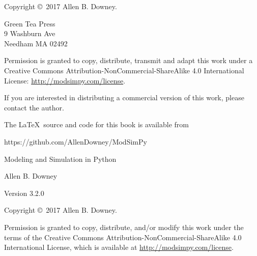 \documentclass[12pt]{book}
\newcommand{\thetitle}{Modeling and Simulation in Python}
\newcommand{\theauthors}{Allen B. Downey}
\newcommand{\theversion}{3.2.0}
\theoremstyle{exercise}
\begin{document}
\begin{latexonly}
\pagebreak
\thispagestyle{empty}

Copyright \copyright ~2017 \theauthors.



\vspace{0.2in}

\begin{flushleft}
Green Tea Press       \\
9 Washburn Ave \\
Needham MA 02492
\end{flushleft}

Permission is granted to copy, distribute, transmit and adapt this work under a Creative Commons Attribution-NonCommercial-ShareAlike 4.0 International License: \url{http://modsimpy.com/license}.


If you are interested in distributing a commercial version of this
work, please contact the author.

The \LaTeX\ source and code for this book is available from

\begin{code}
https://github.com/AllenDowney/ModSimPy
\end{code}


\cleardoublepage
\setcounter{tocdepth}{1}
\tableofcontents

\end{latexonly}



\begin{htmlonly}

\vspace{1em}

{\Large \thetitle}

{\large \theauthors}

Version \theversion

\vspace{1em}

Copyright \copyright ~2017 \theauthors.

Permission is granted to copy, distribute, and/or modify this work
under the terms of the Creative Commons
Attribution-NonCommercial-ShareAlike 4.0 International License, which is
available at \url{http://modsimpy.com/license}.

\vspace{1em}

\setcounter{chapter}{-1}

\end{htmlonly}
\end{document}
